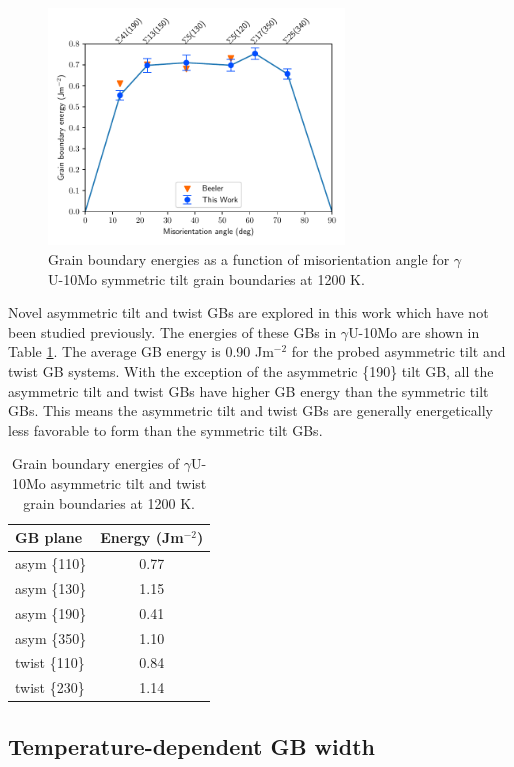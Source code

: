 \documentclass{elsarticle}
\begin{document}
\begin{figure}[!ht]
\centering
\includegraphics[width=0.70\textwidth]{gbe.pdf}
\caption{Grain boundary energies as a function of misorientation angle for $\gamma$U-10Mo symmetric tilt grain boundaries at 1200 K.}
\label{fig:gbe}
\end{figure}

Novel asymmetric tilt and twist GBs are explored in this work which have not been studied previously. The energies of these GBs in $\gamma$U-10Mo are shown in Table \ref{tab:gbe}. The average GB energy is 0.90 Jm$^{-2}$ for the probed asymmetric tilt and twist GB systems. With the exception of the asymmetric \{190\} tilt GB, all the asymmetric tilt and twist GBs have higher GB energy than the symmetric tilt GBs. This means the asymmetric tilt and twist GBs are generally energetically less favorable to form than the symmetric tilt GBs.

\begin{table}[!ht]
\centering
\caption{Grain boundary energies of $\gamma$U-10Mo asymmetric tilt and twist grain boundaries at 1200 K.}
\label{tab:gbe}
\begin{tabular}{lc}
\toprule
GB plane & Energy (Jm$^{-2}$) \\
\midrule
asym \{110\} & 0.77 \\
asym \{130\} & 1.15 \\
asym \{190\} & 0.41 \\
asym \{350\} & 1.10 \\
twist \{110\} & 0.84 \\
twist \{230\} & 1.14 \\
\bottomrule
\end{tabular}
\end{table}


\FloatBarrier
\subsection{Temperature-dependent GB width}\label{sec:res1}
\end{document}
